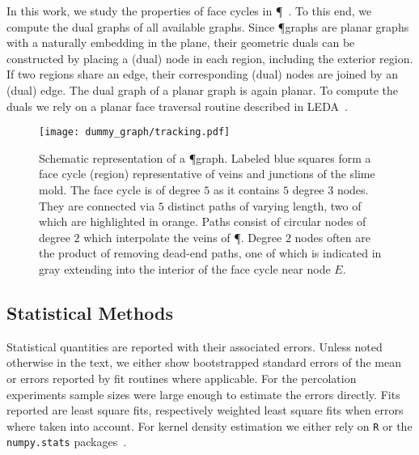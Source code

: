 		In this work, we study the properties of face cycles in \P~\cite{mehlhorn1995leda}. To this end, we compute the dual graphs of all available graphs. Since \P graphs are planar graphs with a naturally embedding in the plane, their geometric duals can be constructed by placing a (dual) node in each region, including the exterior region. If two regions share an edge, their corresponding (dual) nodes are joined by an (dual) edge. The dual graph of a planar graph is again planar. To compute the duals we rely on a planar face traversal routine described in LEDA~\cite{mehlhorn1995leda}.

		\begin{figure}[!htbp]
			\centering
			
			\texttt{[image: dummy\_graph/tracking.pdf]}

			\caption[Graph representation of a \P graph]{Schematic representation of a \P graph. Labeled blue squares form a face cycle (region) representative of veins and junctions of the slime mold. The face cycle is of degree $5$ as it contains $5$ degree $3$ nodes. They are connected via $5$ distinct paths of varying length, two of which are highlighted in orange. Paths consist of circular nodes of degree $2$ which interpolate the veins of \P. Degree $2$ nodes often are the product of removing dead-end paths, one of which is indicated in gray extending into the interior of the face cycle near node $E$.}
			\label{fig:graph_schematic}
		\end{figure}

	\subsection{Statistical Methods}

		Statistical quantities are reported with their associated errors. Unless noted otherwise in the text, we either show bootstrapped standard errors of the mean or errors reported by fit routines where applicable. For the percolation experiments sample sizes were large enough to estimate the errors directly. Fits reported are least square fits, respectively weighted least square fits when errors where taken into account. For kernel density estimation we either rely on \verb+R+ or the \verb+numpy.stats+ packages~\cite{team2013r,jones2001open}.

